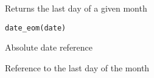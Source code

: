 %
\begin{Description}\relax
Returns the last day of a given month
\end{Description}
%
\begin{Usage}
\begin{verbatim}
date_eom(date)
\end{verbatim}
\end{Usage}
%
\begin{Arguments}
\begin{ldescription}
\item[\code{date}] 
Absolute date reference

\end{ldescription}
\end{Arguments}
%
\begin{Value}
Reference to the last day of the month
\end{Value}
